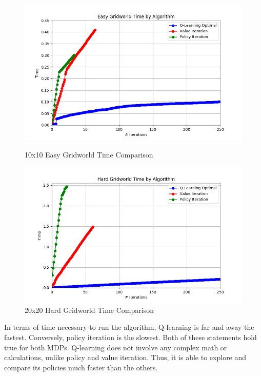 \documentclass[h]{article}
\begin{document}
  \begin{figure}[H]
   \endminipage\hfill
      \includegraphics[width=1\textwidth,keepaspectratio]{easy_time.jpg} 
      \caption*{10x10 Easy Gridworld Time Comparison} 
   \endminipage\hfill
      \includegraphics[width=1\textwidth,keepaspectratio]{hard_time.jpg} 
      \caption*{20x20 Hard Gridworld Time Comparison} 
   \endminipage\hfill
   \endminipage\hfill
\end{figure}
In terms of time necessary to run the algorithm, Q-learning is far and away the 
fastest.  Conversely, policy iteration is the slowest.  Both of these statements 
hold true for both MDPs.  Q-learning does not involve any complex math or 
calculations, unlike policy and value iteration.  Thus, it is able to explore 
and compare its policies much faster than the others.
\end{document}
